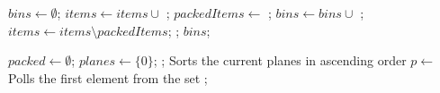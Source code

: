 \documentclass{article}
\begin{document}
\begin{algorithmic}
        \State $bins \gets \emptyset$;
        \State $items \gets items \cup $ ;
        \Repeat
            \State $packedItems \gets $ ;
            \State $bins \gets bins \cup $ ;
            \State $items \gets items \setminus packedItems$;
        ;
        \State \Return $bins$;
    \EndFunction
    \vspace{1cm}

        \State $packed \gets \emptyset$;
        \State $planes \gets \{ 0 \}$;
        \Repeat
            \State {}; \Comment Sorts the current planes in ascending order
            \State $p \gets $  \Comment Polls the first element from the set
        ;
    \EndFunction
\end{algorithmic}
\end{document}
